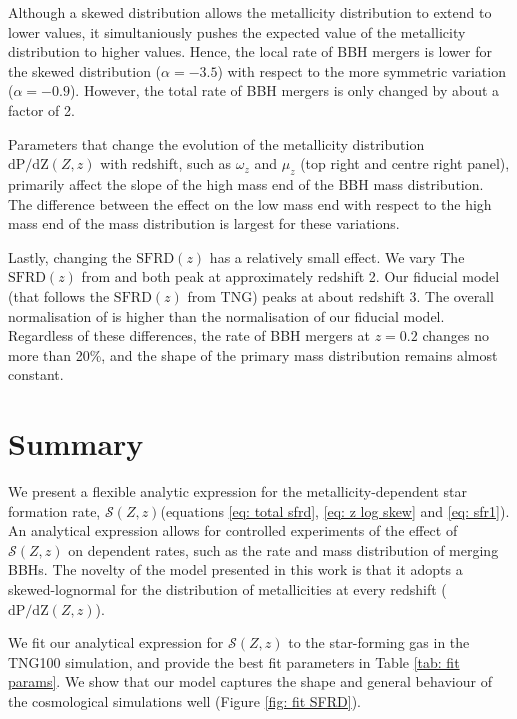 \documentclass[twocolumn]{aastex631}
\newcommand{\SFRDzZ}{\ensuremath{\mathcal{S}(Z,z)}\xspace}
\newcommand{\SFRDz}{\ensuremath{\mathrm{SFRD}(z)}\xspace}
\newcommand{\dpdZ}{\ensuremath{\mathrm{dP/dZ}(Z,z)}\xspace}
\begin{document}
Although a skewed distribution allows the metallicity distribution to extend to lower values, it simultaniously pushes the expected value of the metallicity distribution to higher values. Hence, the local rate of BBH mergers is lower for the skewed distribution ($\alpha = -3.5$) with respect to the more symmetric variation ($\alpha = -0.9$). However, the total rate of BBH mergers is only changed by about a factor of 2. 


Parameters that change the evolution of the metallicity distribution \dpdZ with redshift, such as $\omega_z$ and $\mu_z$ (top right and centre right panel), primarily affect the slope of the high mass end of the BBH mass distribution.
The difference between the effect on the low mass end with respect to the high mass end of the mass distribution is largest for these variations.


Lastly, changing the \SFRDz has a relatively small effect. We vary 
The \SFRDz from \cite{Madau+2017} and \cite{Neijssel+2019} both peak at approximately redshift 2. Our fiducial model (that follows the \SFRDz from TNG) peaks at about redshift 3. The overall normalisation of \cite{Neijssel+2019} is higher than the normalisation of our fiducial model. Regardless of these differences, the rate of BBH mergers at $z=0.2$ changes no more than 20\%, and the shape of the primary mass distribution remains almost constant. 



\section{Summary \label{sec: summary}}
We present a flexible analytic expression for the metallicity-dependent star formation rate, \SFRDzZ (equations \ref{eq: total sfrd}, \ref{eq: z log skew} and \ref{eq: sfr1}). An analytical expression allows for controlled experiments of the effect of \SFRDzZ on dependent rates, such as the rate and mass distribution of merging BBHs. 
The novelty of the model presented in this work is that it adopts a skewed-lognormal for the distribution of metallicities at every redshift (\dpdZ). 

We fit our analytical expression for \SFRDzZ to the star-forming gas in the TNG100 simulation, and provide the best fit parameters in Table \ref{tab: fit params}. We show that our model captures the shape and general behaviour of the cosmological simulations well (Figure \ref{fig: fit SFRD}). 
\end{document}
